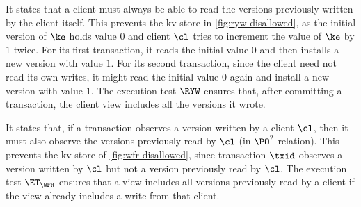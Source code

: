 It states that a client must always be able to read the versions previously written by the client itself.
This prevents the kv-store in \cref{fig:ryw-disallowed}, 
as the initial version of $\ke$ holds value $0$ 
and client $\cl$ tries to increment the value of $\ke$ by $1$ twice.  
For its first transaction, it reads the initial value $0$ and then installs  a new version with value $1$. 
For its second transaction, since the client need not read its own writes, 
it might read the initial value $0$ again and install a new version with value $1$.
The execution test $\RYW$ ensures that, after committing a transaction, 
the client view includes all the versions it wrote.  

It states that, if a transaction observes a version written by a
client $\cl$, then it must also observe the versions previously read by $\cl$ (in $\PO^?$ relation).
This prevents the kv-store of \cref{fig:wfr-disallowed},
since transaction $\txid$ observes a version written by $\cl$ but
not a version previously read by $\cl$.
The execution test $\ET_{\WFR}$  ensures
that a view includes all versions previously read by a client 
if the view already includes a write from that client. 



